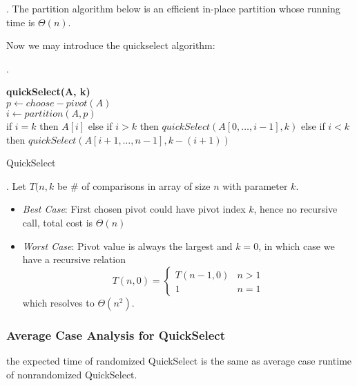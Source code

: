 \documentclass{article}
\begin{document}
\begin{algo}[].
    The partition algorithm below is an efficient in-place partition whose running time is $\Theta(n)$. 
\end{algo}

Now we may introduce the quickselect algorithm: 

\begin{codes}[QuickSelect].
    \begin{algorithm}[H]
        \SetAlgoLined %
        
        \textbf{quickSelect(A, k)}\\
        $p \leftarrow choose-pivot(A)$ \\ 
        $i \leftarrow partition(A, p)$ \\ 
        if $i = k$ then \Return $A[i]$\;  
        else if $i > k$ then \Return $quickSelect(A[0, \ldots, i-1], k)$
        else if $i < k$ then \Return $quickSelect(A[i+1, \ldots, n-1], k-(i+1))$
        \caption{QuickSelect}
    \end{algorithm}
\end{codes}

\begin{result}[].
    Let $T(n,k$ be \# of comparisons in array of size $n$ with parameter $k$. \begin{itemize}
        \item \textit{Best Case}: First chosen pivot could have pivot index $k$, hence no recursive call, total cost is $\Theta(n)$
        \item \textit{Worst Case}: Pivot value is always the largest and $k = 0$, in which case we have a recursive relation
        \[ T(n, 0) = \begin{cases}
            T(n - 1, 0) & n > 1 \\ 
            1 & n = 1
        \end{cases} \]
        which resolves to $\Theta(n^2)$. 
    \end{itemize}
\end{result}

\subsubsection{Average Case Analysis for QuickSelect}

the expected time of randomized QuickSelect is the same as average case runtime of nonrandomized QuickSelect. 
\end{document}
